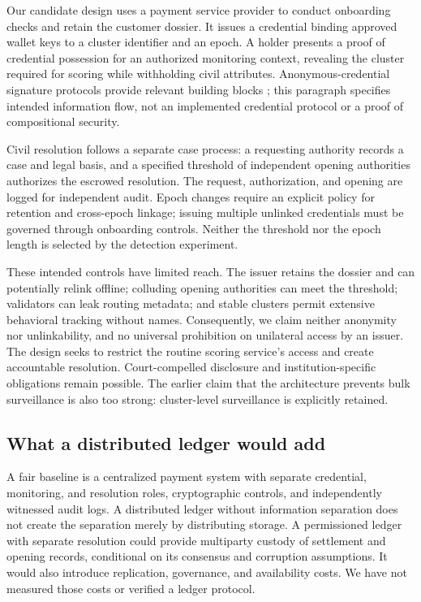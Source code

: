 \documentclass[11pt,a4paper]{article}
\begin{document}
Our candidate design uses a payment service provider to conduct onboarding checks and retain the customer dossier. It issues a credential binding approved wallet keys to a cluster identifier and an epoch. A holder presents a proof of credential possession for an authorized monitoring context, revealing the cluster required for scoring while withholding civil attributes. Anonymous-credential signature protocols provide relevant building blocks \citep{CL}; this paragraph specifies intended information flow, not an implemented credential protocol or a proof of compositional security.

Civil resolution follows a separate case process: a requesting authority records a case and legal basis, and a specified threshold of independent opening authorities authorizes the escrowed resolution. The request, authorization, and opening are logged for independent audit. Epoch changes require an explicit policy for retention and cross-epoch linkage; issuing multiple unlinked credentials must be governed through onboarding controls. Neither the threshold nor the epoch length is selected by the detection experiment.

These intended controls have limited reach. The issuer retains the dossier and can potentially relink offline; colluding opening authorities can meet the threshold; validators can leak routing metadata; and stable clusters permit extensive behavioral tracking without names. Consequently, we claim neither anonymity nor unlinkability, and no universal prohibition on unilateral access by an issuer. The design seeks to restrict the routine scoring service's access and create accountable resolution. Court-compelled disclosure and institution-specific obligations remain possible. The earlier claim that the architecture prevents bulk surveillance is also too strong: cluster-level surveillance is explicitly retained.

\subsection{What a distributed ledger would add}
A fair baseline is a centralized payment system with separate credential, monitoring, and resolution roles, cryptographic controls, and independently witnessed audit logs. A distributed ledger without information separation does not create the separation merely by distributing storage. A permissioned ledger with separate resolution could provide multiparty custody of settlement and opening records, conditional on its consensus and corruption assumptions. It would also introduce replication, governance, and availability costs. We have not measured those costs or verified a ledger protocol.
\end{document}
